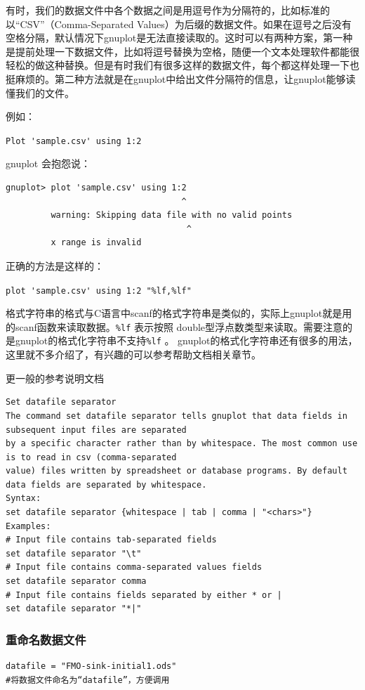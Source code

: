 有时，我们的数据文件中各个数据之间是用逗号作为分隔符的，比如标准的以“CSV”（Comma-Separated Values）为后缀的数据文件。如果在逗号之后没有空格分隔，默认情况下gnuplot是无法直接读取的。这时可以有两种方案，第一种是提前处理一下数据文件，比如将逗号替换为空格，随便一个文本处理软件都能很轻松的做这种替换。但是有时我们有很多这样的数据文件，每个都这样处理一下也挺麻烦的。第二种方法就是在gnuplot中给出文件分隔符的信息，让gnuplot能够读懂我们的文件。

例如：

\verb*|Plot 'sample.csv' using 1:2|

gnuplot 会抱怨说：
\begin{verbatim}
gnuplot> plot 'sample.csv' using 1:2
                                   ^
         warning: Skipping data file with no valid points
                                    ^
         x range is invalid
\end{verbatim}

正确的方法是这样的：

\verb*|plot 'sample.csv' using 1:2 "%lf,%lf"|

格式字符串的格式与C语言中scanf的格式字符串是类似的，实际上gnuplot就是用的scanf函数来读取数据。\verb|%lf| 
表示按照 double型浮点数类型来读取。需要注意的是gnuplot的格式化字符串不支持\verb|%lf| 。
gnuplot的格式化字符串还有很多的用法，这里就不多介绍了，有兴趣的可以参考帮助文档相关章节。

更一般的参考说明文档
\begin{verbatim}
Set datafile separator
The command set datafile separator tells gnuplot that data fields in subsequent input files are separated
by a specific character rather than by whitespace. The most common use is to read in csv (comma-separated
value) files written by spreadsheet or database programs. By default data fields are separated by whitespace.
Syntax:
set datafile separator {whitespace | tab | comma | "<chars>"}
Examples:
# Input file contains tab-separated fields
set datafile separator "\t"
# Input file contains comma-separated values fields
set datafile separator comma
# Input file contains fields separated by either * or |
set datafile separator "*|"
\end{verbatim}


\subsubsection{重命名数据文件}
\begin{verbatim}
datafile = "FMO-sink-initial1.ods"
#将数据文件命名为“datafile”，方便调用
\end{verbatim}



